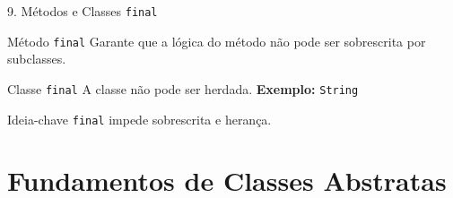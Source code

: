 \documentclass[9pt]{beamer}
\begin{document}
\begin{frame}{9. Métodos e Classes \texttt{final}}

\begin{block}{Método \texttt{final}}
Garante que a lógica do método não pode ser sobrescrita por subclasses.
\end{block}

\vspace{0.2cm}

\begin{center}
\end{center}

\vspace{0.3cm}

\begin{block}{Classe \texttt{final}}
A classe não pode ser herdada.
\textbf{Exemplo:} \texttt{String}
\end{block}

\vspace{0.2cm}

\begin{center}
\end{center}

\vspace{0.2cm}

\begin{block}{Ideia-chave}
\texttt{final} impede sobrescrita e herança.
\end{block}

\end{frame}



\section{Fundamentos de Classes Abstratas}
\end{document}
